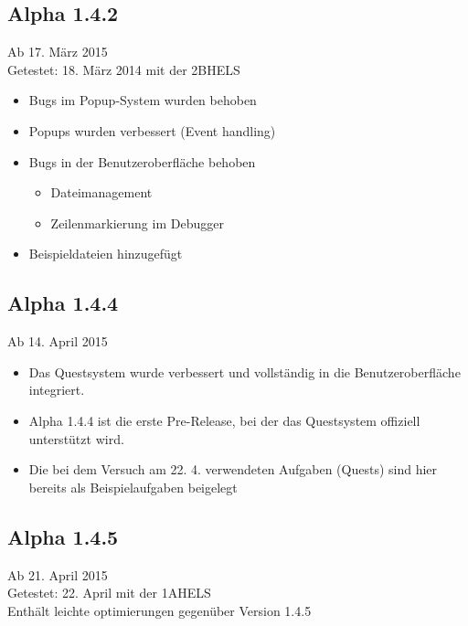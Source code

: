 \subsection*{Alpha 1.4.2}
Ab 17. März 2015\\
Getestet: 18. März 2014 mit der 2BHELS
\begin{itemize}
\item Bugs im Popup-System wurden behoben
\item Popups wurden verbessert (Event handling)
\item Bugs in der Benutzeroberfläche behoben
\begin{itemize}
\item Dateimanagement
\item Zeilenmarkierung im Debugger
\end{itemize}
\item Beispieldateien hinzugefügt
\end{itemize}

\subsection*{Alpha 1.4.4}
Ab 14. April 2015
\begin{itemize}
\item Das Questsystem wurde verbessert und vollständig in die Benutzeroberfläche integriert.
\item Alpha 1.4.4 ist die erste Pre-Release, bei der das Questsystem offiziell unterstützt wird.
\item Die bei dem Versuch am 22. 4. verwendeten Aufgaben (Quests) sind hier bereits als Beispielaufgaben beigelegt
\end{itemize}

\subsection*{Alpha 1.4.5}
Ab 21. April 2015\\
Getestet: 22. April mit der 1AHELS\\
Enthält leichte optimierungen gegenüber Version 1.4.5 


